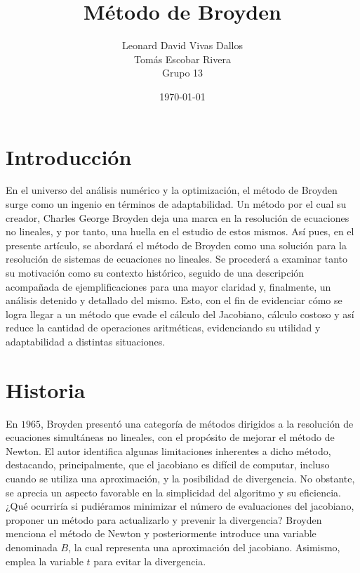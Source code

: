 \documentclass[12pt]{article}
\title{Método de Broyden}
\author{Leonard David Vivas Dallos \\ Tomás Escobar Rivera \\ Grupo 13}
\date{\today}
\begin{document}
\maketitle

\tableofcontents

\section{Introducción}

En el universo del análisis numérico y la optimización, el método de Broyden surge como un ingenio en términos de adaptabilidad. Un método por el cual su creador, Charles George Broyden deja una marca en la resolución de ecuaciones no lineales, y por tanto, una huella en el estudio de estos mismos. Así pues, en el presente artículo, se abordará el método de Broyden como una solución para la resolución de sistemas de ecuaciones no lineales. Se procederá a examinar tanto su motivación como su contexto histórico, seguido de una descripción acompañada de ejemplificaciones para una mayor claridad y, finalmente, un análisis detenido y detallado del mismo. Esto, con el fin de evidenciar cómo se logra llegar a un método que evade el cálculo del Jacobiano, cálculo costoso y así reduce la cantidad de operaciones aritméticas, evidenciando su utilidad y adaptabilidad a distintas situaciones.

\section{Historia}

En $1965$, Broyden presentó una categoría de métodos dirigidos a la resolución de ecuaciones simultáneas no lineales, con el propósito de mejorar el método de Newton. El autor identifica algunas limitaciones inherentes a dicho método, destacando, principalmente, que el jacobiano es difícil de computar, incluso cuando se utiliza una aproximación, y la posibilidad de divergencia. No obstante, se aprecia un aspecto favorable en la simplicidad del algoritmo y su eficiencia. ¿Qué ocurriría si pudiéramos minimizar el número de evaluaciones del jacobiano, proponer un método para actualizarlo y prevenir la divergencia? Broyden menciona el método de Newton y posteriormente introduce una variable denominada $B$, la cual representa una aproximación del jacobiano. Asimismo, emplea la variable $t$ para evitar la divergencia.
\end{document}
